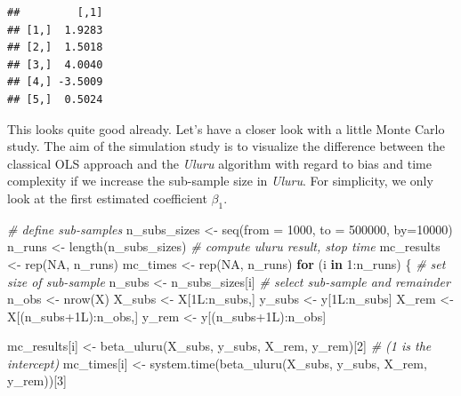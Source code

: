 \documentclass[
  12pt,
]{style/krantz}
\newenvironment{Shaded}{\begin{snugshade}}{\end{snugshade}}
\newcommand{\AttributeTok}[1]{\textcolor[rgb]{0.77,0.63,0.00}{#1}}
\newcommand{\CommentTok}[1]{\textcolor[rgb]{0.56,0.35,0.01}{\textit{#1}}}
\newcommand{\ConstantTok}[1]{\textcolor[rgb]{0.00,0.00,0.00}{#1}}
\newcommand{\ControlFlowTok}[1]{\textcolor[rgb]{0.13,0.29,0.53}{\textbf{#1}}}
\newcommand{\DecValTok}[1]{\textcolor[rgb]{0.00,0.00,0.81}{#1}}
\newcommand{\FunctionTok}[1]{\textcolor[rgb]{0.00,0.00,0.00}{#1}}
\newcommand{\NormalTok}[1]{#1}
\newcommand{\OtherTok}[1]{\textcolor[rgb]{0.56,0.35,0.01}{#1}}
\newcommand{\SpecialCharTok}[1]{\textcolor[rgb]{0.00,0.00,0.00}{#1}}
\begin{document}
\begin{verbatim}
##         [,1]
## [1,]  1.9283
## [2,]  1.5018
## [3,]  4.0040
## [4,] -3.5009
## [5,]  0.5024
\end{verbatim}

This looks quite good already. Let's have a closer look with a little Monte Carlo study. The aim of the simulation study is to visualize the difference between the classical OLS approach and the \emph{Uluru} algorithm with regard to bias and time complexity if we increase the sub-sample size in \emph{Uluru}. For simplicity, we only look at the first estimated coefficient \(\beta_{1}\).

\begin{Shaded}
\begin{Highlighting}[]
\CommentTok{\# define sub{-}samples}
\NormalTok{n\_subs\_sizes }\OtherTok{\textless{}{-}} \FunctionTok{seq}\NormalTok{(}\AttributeTok{from =} \DecValTok{1000}\NormalTok{, }\AttributeTok{to =} \DecValTok{500000}\NormalTok{, }\AttributeTok{by=}\DecValTok{10000}\NormalTok{)}
\NormalTok{n\_runs }\OtherTok{\textless{}{-}} \FunctionTok{length}\NormalTok{(n\_subs\_sizes)}
\CommentTok{\# compute uluru result, stop time}
\NormalTok{mc\_results }\OtherTok{\textless{}{-}} \FunctionTok{rep}\NormalTok{(}\ConstantTok{NA}\NormalTok{, n\_runs)}
\NormalTok{mc\_times }\OtherTok{\textless{}{-}} \FunctionTok{rep}\NormalTok{(}\ConstantTok{NA}\NormalTok{, n\_runs)}
\ControlFlowTok{for}\NormalTok{ (i }\ControlFlowTok{in} \DecValTok{1}\SpecialCharTok{:}\NormalTok{n\_runs) \{}
     \CommentTok{\# set size of sub{-}sample}
\NormalTok{     n\_subs }\OtherTok{\textless{}{-}}\NormalTok{ n\_subs\_sizes[i]}
     \CommentTok{\# select sub{-}sample and remainder}
\NormalTok{     n\_obs }\OtherTok{\textless{}{-}} \FunctionTok{nrow}\NormalTok{(X)}
\NormalTok{     X\_subs }\OtherTok{\textless{}{-}}\NormalTok{ X[1L}\SpecialCharTok{:}\NormalTok{n\_subs,]}
\NormalTok{     y\_subs }\OtherTok{\textless{}{-}}\NormalTok{ y[1L}\SpecialCharTok{:}\NormalTok{n\_subs]}
\NormalTok{     X\_rem }\OtherTok{\textless{}{-}}\NormalTok{ X[(n\_subs}\SpecialCharTok{+}\NormalTok{1L)}\SpecialCharTok{:}\NormalTok{n\_obs,]}
\NormalTok{     y\_rem }\OtherTok{\textless{}{-}}\NormalTok{ y[(n\_subs}\SpecialCharTok{+}\NormalTok{1L)}\SpecialCharTok{:}\NormalTok{n\_obs]}
     
\NormalTok{     mc\_results[i] }\OtherTok{\textless{}{-}} \FunctionTok{beta\_uluru}\NormalTok{(X\_subs,}
\NormalTok{                                 y\_subs,}
\NormalTok{                                 X\_rem,}
\NormalTok{                                 y\_rem)[}\DecValTok{2}\NormalTok{] }\CommentTok{\# (1 is the intercept)}
\NormalTok{     mc\_times[i] }\OtherTok{\textless{}{-}} \FunctionTok{system.time}\NormalTok{(}\FunctionTok{beta\_uluru}\NormalTok{(X\_subs,}
\NormalTok{                                           y\_subs,}
\NormalTok{                                           X\_rem,}
\NormalTok{                                           y\_rem))[}\DecValTok{3}\NormalTok{]}
     

\end{Highlighting}
\end{Shaded}
\end{document}
